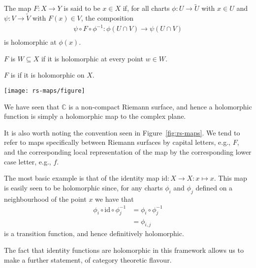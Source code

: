\begin{definition}[Holomorphicity]\label{def:holomorphic}
	The map $ F:X \to Y $ is said to be  $ x \in X $ if, for
	all charts $ \phi:U \to \tilde{U} $ with $ x \in U $ and $ \psi: V \to \tilde{V}
	$ with $ F(x) \in V $, the composition
	\begin{align*}
		\psi \circ F \circ \phi ^{-1}: \phi(U \cap V) \to \psi(U \cap V) \\
	\end{align*}
	is holomorphic at $ \phi(x) $.

	$ F $ is  $ W \subseteq X $ if it is holomorphic at
	every point $ w \in W $.

	$ F $ is  if it is holomorphic on $ X $.
\end{definition}

\begin{figure*}
	\centering
	\texttt{[image: rs-maps/figure]}
	\caption{The map $ F $ is holomorphic if and only if the map $ f $ is
		holomorphic.}
	\label{fig:rs-maps}
\end{figure*}

\begin{remark}
	We have seen that $ \mathbb{C} $ is a non-compact Riemann surface, and hence a
	holomorphic function is simply a holomorphic map to the complex plane.

	It is also worth noting the convention seen in Figure~\ref{fig:rs-maps}. We
	tend to refer to maps specifically between Riemann surfaces by capital
	letters, e.g., $ F $, and the corresponding local representation of the map by
	the corresponding lower case letter, e.g., $ f $.
\end{remark}

\begin{example}\label{ex:holo-id}
	The most basic example is that of the identity map $ \mathrm{id}:X \to X:x
		\mapsto x $. This map is easily seen to be holomorphic since, for any charts $
		\phi_i $ and $ \phi_j $ defined on a neighbourhood of the point $ x $ we have
	that
	\begin{align*}
		\phi_i \circ \mathrm{id} \circ \phi_j ^{-1} & = \phi_i \circ \phi_j ^{-1} \\
		                                            & = \phi _{i,j}
	\end{align*}
	is a transition function, and hence definitively holomorphic.
\end{example}

The fact that identity functions are holomorphic in this
framework allows us to make a further statement, of category theoretic
flavour.

